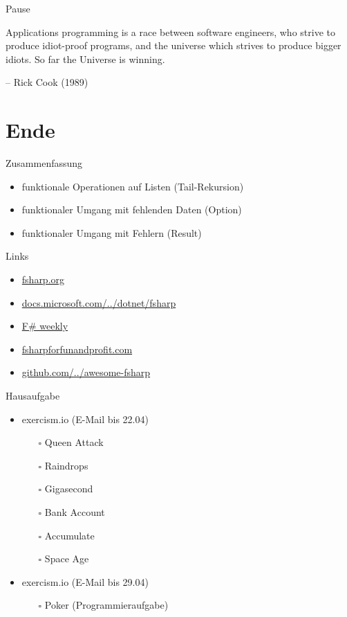 \documentclass[t]{beamer}
\begin{document}
\begin{frame}[label={sec:orgbad2ad2}]{Pause}
\begin{block}{}
Applications programming is a race between software engineers, 
who strive to produce idiot-proof programs, 
and the universe which strives to produce bigger idiots. 
So far the Universe is winning.

\null\hfill-- Rick Cook (1989)
\end{block}
\end{frame}

\section{Ende }
\label{sec:org545586a}
\begin{frame}[label={sec:orge34aa6a}]{Zusammenfassung}
\begin{itemize}
\item funktionale Operationen auf Listen (Tail-Rekursion)
\item funktionaler Umgang mit fehlenden Daten (Option)
\item funktionaler Umgang mit Fehlern (Result)
\end{itemize}
\end{frame}

\begin{frame}[label={sec:org725bf19}]{Links}
\begin{itemize}
\item \href{https://fsharp.org/}{fsharp.org}
\item \href{https://docs.microsoft.com/de-de/dotnet/fsharp/}{docs.microsoft.com/../dotnet/fsharp}
\item \href{https://sergeytihon.com/}{F\# weekly}
\item \href{https://fsharpforfunandprofit.com/}{fsharpforfunandprofit.com}
\item \href{https://github.com/fsprojects/awesome-fsharp}{github.com/../awesome-fsharp}
\end{itemize}
\end{frame}

\begin{frame}[label={sec:org9bf9c46}]{Hausaufgabe}
\begin{itemize}
\item exercism.io (E-Mail bis 22.04)
\begin{itemize}
\item[{$\square$}] Queen Attack
\item[{$\square$}] Raindrops
\item[{$\square$}] Gigasecond
\item[{$\square$}] Bank Account
\item[{$\square$}] Accumulate
\item[{$\square$}] Space Age
\end{itemize}

\item exercism.io (E-Mail bis 29.04)
\begin{itemize}
\item[{$\square$}] Poker (Programmieraufgabe)
\end{itemize}
\end{itemize}
\end{frame}
\end{document}
